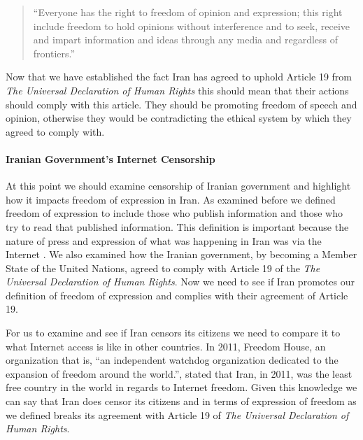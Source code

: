 \documentclass[11pt]{article}
\begin{document}
\begin{multicols}{2}
\begin{quotation} 
  ``Everyone has the right to freedom of opinion and expression;
  this right include freedom to hold opinions without interference and to seek,
  receive and impart information and ideas through any media and regardless of
  frontiers.''\cite{UniversalDeclerationOfHumanRights}
\end{quotation}

Now that we have established the fact Iran has agreed to uphold Article 19
from \textit{The Universal Declaration of Human Rights} this should mean that
their actions should comply with this article. They should be promoting freedom
of speech and opinion, otherwise they would be contradicting the ethical system
by which they agreed to comply with.

\paragraph{Iranian Government's Internet Censorship}

At this point we should examine censorship of Iranian government and highlight
how it impacts freedom of expression in Iran. As examined before we defined
freedom of expression to include those who publish information and those
who try to read that published information. This definition is important
because the nature of press and expression of what was happening in Iran was via
the Internet . We also examined how the Iranian government, by becoming a
Member State of the United Nations, agreed to comply with Article 19 of the
\textit{The Universal Declaration of Human Rights}. Now we need to see if Iran
promotes our definition of freedom of expression and complies with their
agreement of Article 19.

For us to examine and see if Iran censors its citizens we need to compare it to
what Internet access is like in other countries. In 2011, Freedom House, an
organization that is, ``an independent watchdog organization dedicated to the
expansion of freedom around the world.''\cite{FreedomHouse}, stated that Iran,
in 2011, was the least free country in the world in regards to Internet
freedom.\cite{FreedomOnNet2011, ONI:IranWorst} Given this knowledge we can say
that Iran does censor its citizens and in terms of expression of freedom as we
defined breaks its agreement with Article 19 of \textit{The Universal
Declaration of Human Rights}. 



\end{multicols}
\end{document}
